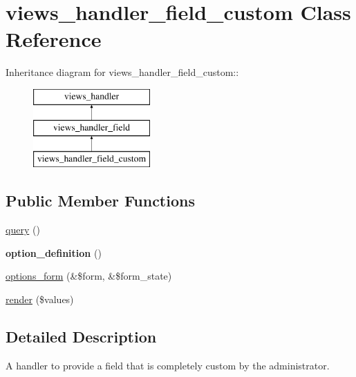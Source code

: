\hypertarget{classviews__handler__field__custom}{
\section{views\_\-handler\_\-field\_\-custom Class Reference}
\label{classviews__handler__field__custom}
}
Inheritance diagram for views\_\-handler\_\-field\_\-custom::\begin{figure}[H]
\begin{center}
\leavevmode
\includegraphics[height=3cm]{classviews__handler__field__custom}
\end{center}
\end{figure}
\subsection*{Public Member Functions}
\begin{DoxyCompactItemize}
\item 
\hyperlink{classviews__handler__field__custom_a153c21f3d05ff9f27e345f2c98058bc4}{query} ()
\item 
\hypertarget{classviews__handler__field__custom_a4089ad30293453649f51d4a68005bea1}{
{\bfseries option\_\-definition} ()}
\label{classviews__handler__field__custom_a4089ad30293453649f51d4a68005bea1}

\item 
\hyperlink{classviews__handler__field__custom_a886688de7d2ac5bc4ef3b588a2e5056a}{options\_\-form} (\&\$form, \&\$form\_\-state)
\item 
\hyperlink{classviews__handler__field__custom_a0498d3ad0dff40c9e49ec599363c2157}{render} (\$values)
\end{DoxyCompactItemize}


\subsection{Detailed Description}
A handler to provide a field that is completely custom by the administrator. 

